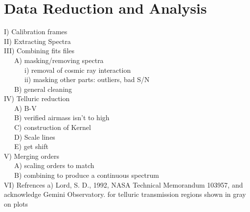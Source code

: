 \section{Data Reduction and Analysis}

I) Calibration frames\\

II) Extracting Spectra\\

III) Combining fits files\\
~~~A) masking/removing spectra\\
~~~~~~i) removal of cosmic ray interaction\\
~~~~~~ii) masking other parts: outliers, bad S/N\\
~~~B) general cleaning\\

IV) Telluric reduction\\
~~~A) B-V\\
~~~B) verified airmass isn't to high\\
~~~C) construction of Kernel\\
~~~D) Scale lines\\
~~~E) get shift\\

V) Merging orders\\
~~~A) scaling orders to match\\
~~~B) combining to produce a continuous spectrum\\

VI) Refrences
  a) Lord, S. D., 1992, NASA Technical Memorandum 103957, and acknowledge Gemini Observatory.
  for telluric transmission regions shown in gray on plots
  
  
  
  
  